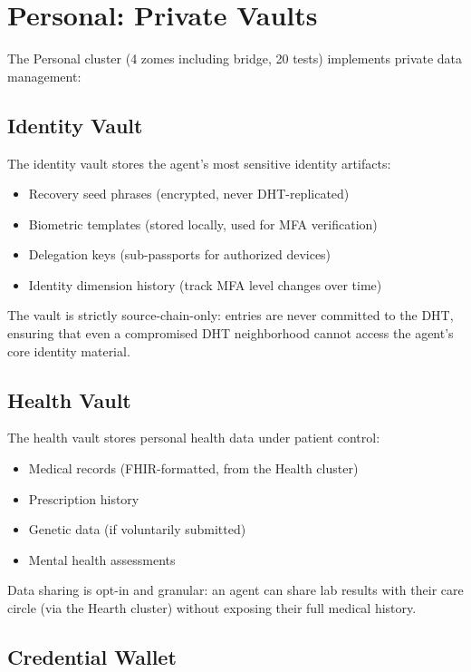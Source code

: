 \documentclass[12pt]{book}
\begin{document}
\section{Personal: Private Vaults}

The Personal cluster (4 zomes including bridge, 20 tests) implements
private data management:

\subsection{Identity Vault}

The identity vault stores the agent's most sensitive identity artifacts:

\begin{itemize}
  \item Recovery seed phrases (encrypted, never DHT-replicated)
  \item Biometric templates (stored locally, used for MFA verification)
  \item Delegation keys (sub-passports for authorized devices)
  \item Identity dimension history (track MFA level changes over time)
\end{itemize}

The vault is strictly source-chain-only: entries are never committed to the
DHT, ensuring that even a compromised DHT neighborhood cannot access the
agent's core identity material.

\subsection{Health Vault}

The health vault stores personal health data under patient control:

\begin{itemize}
  \item Medical records (FHIR-formatted, from the Health cluster)
  \item Prescription history
  \item Genetic data (if voluntarily submitted)
  \item Mental health assessments
\end{itemize}

Data sharing is opt-in and granular: an agent can share lab results with
their care circle (via the Hearth cluster) without exposing their full
medical history.

\subsection{Credential Wallet}
\end{document}
